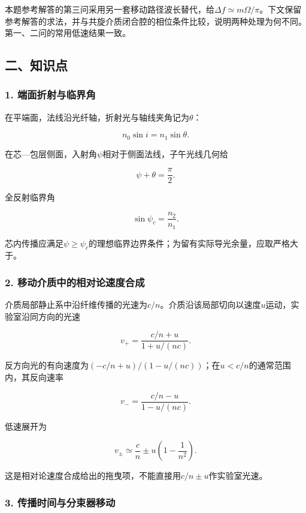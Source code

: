 \documentclass[12pt,a4paper,fontset=fandol]{ctexart}
\begin{document}
本题参考解答的第三问采用另一套移动路径波长替代，给\(\Delta f\simeq m\Omega/\pi\)。下文保留参考解答的求法，并与共旋介质闭合腔的相位条件比较，说明两种处理为何不同。第一、二问的常用低速结果一致。

\subsection{二、知识点}\label{ux4e8cux77e5ux8bc6ux70b9-5}

\subsubsection{1.
端面折射与临界角}\label{ux7aefux9762ux6298ux5c04ux4e0eux4e34ux754cux89d2}

在平端面，法线沿光纤轴，折射光与轴线夹角记为\(\theta\)：

\[
n_0\sin i=n_1\sin\theta.
\]

在芯---包层侧面，入射角\(\psi\)相对于侧面法线，子午光线几何给

\[
\psi+\theta=\frac\pi2.
\]

全反射临界角

\[
\sin\psi_c=\frac{n_2}{n_1}.
\]

芯内传播应满足\(\psi\geq\psi_c\)的理想临界边界条件；为留有实际导光余量，应取严格大于。

\subsubsection{2.
移动介质中的相对论速度合成}\label{ux79fbux52a8ux4ecbux8d28ux4e2dux7684ux76f8ux5bf9ux8bbaux901fux5ea6ux5408ux6210}

介质局部静止系中沿纤维传播的光速为\(c/n\)。介质沿该局部切向以速度\(u\)运动，实验室沿同方向的光速

\[
v_+=\frac{c/n+u}{1+u/(nc)}.
\]

反方向光的有向速度为\((-c/n+u)/(1-u/(nc))\)；在\(u<c/n\)的通常范围内，其反向速率

\[
v_-=\frac{c/n-u}{1-u/(nc)}.
\]

低速展开为

\[
v_\pm\simeq\frac cn
\pm u\left(1-\frac1{n^2}\right).
\]

这是相对论速度合成给出的拖曳项，不能直接用\(c/n\pm u\)作实验室光速。

\subsubsection{3.
传播时间与分束器移动}\label{ux4f20ux64adux65f6ux95f4ux4e0eux5206ux675fux5668ux79fbux52a8}
\end{document}
